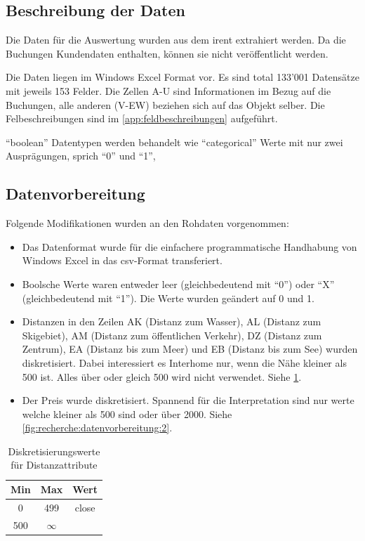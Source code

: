 \subsection{Beschreibung der Daten}
\label{sec:recherche:datenbeschaffung}
Die Daten für die Auswertung wurden aus dem \gls{irent} extrahiert werden. Da die Buchungen Kundendaten enthalten, können sie nicht veröffentlicht werden.

Die Daten liegen im Windows Excel Format vor. Es sind total 133'001 Datensätze mit jeweils 153 Felder. Die Zellen A-U sind Informationen im Bezug auf die Buchungen, alle anderen (V-EW) beziehen sich auf das Objekt selber. Die Felbeschreibungen sind im \cref{app:feldbeschreibungen} aufgeführt.

"`boolean"' Datentypen werden behandelt wie "`categorical"' Werte mit nur zwei Ausprägungen, sprich "`0"' und "`1"',

\subsection{Datenvorbereitung}
\label{sec:recherche:datenvorbereitung}
Folgende Modifikationen wurden an den Rohdaten vorgenommen:
\begin{itemize}
\item Das Datenformat wurde für die einfachere programmatische Handhabung von Windows Excel in das \gls{csv}-Format transferiert.
\item Boolsche Werte waren entweder leer (gleichbedeutend mit "`0"') oder "`X"' (gleichbedeutend mit "`1"'). Die Werte wurden geändert auf 0 und 1.
\item Distanzen in den Zeilen AK (Distanz zum Wasser), AL (Distanz zum Skigebiet), AM (Distanz zum öffentlichen Verkehr), DZ (Distanz zum Zentrum), EA (Distanz bis zum Meer) und EB (Distanz bis zum See) wurden diskretisiert. Dabei interessiert es Interhome nur, wenn die Nähe kleiner als 500 ist. Alles über oder gleich 500 wird nicht verwendet. Siehe \cref{fig:recherche:datenvorbereitung:1}.
\item Der Preis wurde diskretisiert. Spannend für die Interpretation sind nur werte welche kleiner als 500 sind oder über 2000. Siehe \cref{fig:recherche:datenvorbereitung:2}.
\end{itemize}

\begin{table}[h] 
	\caption{Diskretisierungswerte für Distanzattribute}
	\centering
	\label{fig:recherche:datenvorbereitung:1}
	\begin{tabular}{ | c | c | c |} 
		\hline 
		\rowcolor{tableheadcolor}
		\bfseries Min & \bfseries Max & \bfseries Wert \\ \hline 
		0 & 499 & close \\ \hline 
		500 & $\infty$ &   \\ \hline 
	\end{tabular}
\end{table}

